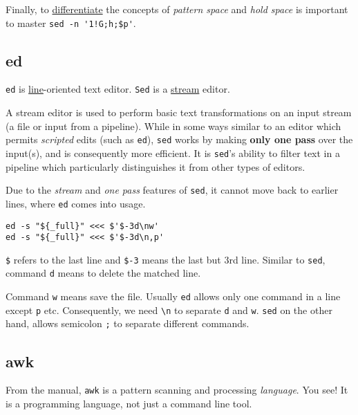 Finally, to
\href{https://stackoverflow.com/q/12833714}{differentiate} the
concepts of \textit{pattern space} and \textit{hold space} is
important to master \lstinline|sed -n '1!G;h;$p'|.

\subsection{ed}
\label{sec:bash-ed}

\lstinline|ed| is \uline{line}-oriented text
editor. \lstinline|Sed| is a \uline{stream} editor.

A stream editor is used to perform basic text transformations on
an input stream (a file or input from a pipeline). While in some
ways similar to an editor which permits \textit{scripted} edits
(such as \lstinline{ed}), \lstinline|sed| works by making
\textbf{only one pass} over the input(s), and is consequently more
efficient. It is \lstinline|sed|'s ability to filter text in a
pipeline which particularly distinguishes it from other types of
editors.

Due to the \textit{stream} and \textit{one pass} features of
\lstinline|sed|, it cannot move back to earlier lines, where
\lstinline|ed| comes into usage.

\begin{lstlisting}
ed -s "${_full}" <<< $'$-3d\nw'
ed -s "${_full}" <<< $'$-3d\n,p'
\end{lstlisting}

\verb|$| refers to the last line and \lstinline|$-3| means the
last but 3rd line. Similar to \lstinline|sed|, command \verb|d|
means to delete the matched line.

Command \verb|w| means save the file. Usually \lstinline|ed|
allows only one command in a line except \verb|p|
etc. Consequently, we need \verb|\n| to separate \verb|d| and
\verb|w|. \lstinline|sed| on the other hand, allows semicolon
\lstinline|;| to separate different commands.

\subsection{awk}
\label{sec:bash-awk}

From the manual, \lstinline|awk| is a pattern scanning and
processing \textit{language}. You see! It is a programming
language, not just a command line tool.

